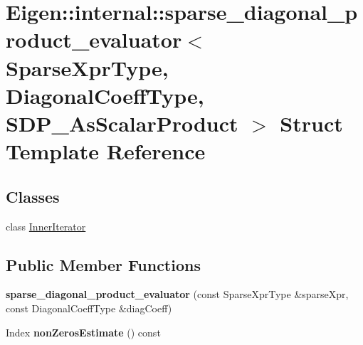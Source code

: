 \hypertarget{struct_eigen_1_1internal_1_1sparse__diagonal__product__evaluator_3_01_sparse_xpr_type_00_01_diag3ebd66799ce02a814119c716700b9642}{}\section{Eigen\+::internal\+::sparse\+\_\+diagonal\+\_\+product\+\_\+evaluator$<$ Sparse\+Xpr\+Type, Diagonal\+Coeff\+Type, S\+D\+P\+\_\+\+As\+Scalar\+Product $>$ Struct Template Reference}
\label{struct_eigen_1_1internal_1_1sparse__diagonal__product__evaluator_3_01_sparse_xpr_type_00_01_diag3ebd66799ce02a814119c716700b9642}
\subsection*{Classes}
\begin{DoxyCompactItemize}
\item 
class \mbox{\hyperlink{class_eigen_1_1internal_1_1sparse__diagonal__product__evaluator_3_01_sparse_xpr_type_00_01_diagocbb91bd40f7346bf4110a7aa087884f6}{Inner\+Iterator}}
\end{DoxyCompactItemize}
\subsection*{Public Member Functions}
\begin{DoxyCompactItemize}
\item 
\mbox{\label{struct_eigen_1_1internal_1_1sparse__diagonal__product__evaluator_3_01_sparse_xpr_type_00_01_diag3ebd66799ce02a814119c716700b9642_a69344fb46e3be2193d59f20550bc1e39}} 
{\bfseries sparse\+\_\+diagonal\+\_\+product\+\_\+evaluator} (const Sparse\+Xpr\+Type \&sparse\+Xpr, const Diagonal\+Coeff\+Type \&diag\+Coeff)
\item 
\mbox{\label{struct_eigen_1_1internal_1_1sparse__diagonal__product__evaluator_3_01_sparse_xpr_type_00_01_diag3ebd66799ce02a814119c716700b9642_a3b9b8393fbc399baafee579cff2e8b7d}} 
Index {\bfseries non\+Zeros\+Estimate} () const
\end{DoxyCompactItemize}
